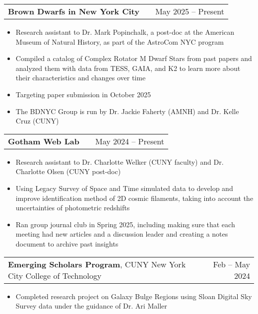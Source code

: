 \documentclass[a4paper,12pt]{article}
\makeatletter
\newenvironment{joblong}[2]
    {
    \begin{tabularx}{\linewidth}{@{}l X r@{}}
    #1 & \hfill &  #2 \\[3.75pt]
    \end{tabularx}
    \begin{minipage}[t]{\linewidth}
    \begin{itemize}[nosep,after=\strut, leftmargin=1em, itemsep=3pt,label=--]
    }
    {
    \end{itemize}
    \end{minipage}    
    }
\makeatother
\begin{document}
\begin{joblong}{\textbf{Brown Dwarfs in New York City}}{May 2025 -- Present}
\item Research assistant to Dr. Mark Popinchalk, a post-doc at the American Museum of Natural History, as part of the AstroCom NYC program
\item Compiled a catalog of Complex Rotator M Dwarf Stars from past papers and analyzed them with data from TESS, GAIA, and K2 to learn more about their characteristics and changes over time
\item Targeting paper submission in October 2025
\item The BDNYC Group is run by Dr. Jackie Faherty (AMNH) and Dr. Kelle Cruz (CUNY)
\end{joblong}

\begin{joblong}{\textbf{Gotham Web Lab}}{May 2024 -- Present}
\item Research assistant to Dr. Charlotte Welker (CUNY faculty) and Dr. Charlotte Olsen (CUNY post-doc)
\item Using Legacy Survey of Space and Time simulated data to develop and improve identification method of 2D cosmic filaments, taking into account the uncertainties of photometric redshifts
\item Ran group journal club in Spring 2025, including making sure that each meeting had new articles and a discussion leader and creating a notes document to archive past insights
\end{joblong}

\begin{joblong}{\textbf{Emerging Scholars Program}, CUNY New York City College of Technology}{Feb -- May 2024}
\item Completed research project on Galaxy Bulge Regions using Sloan Digital Sky Survey data under the guidance of Dr. Ari Maller 
\end{joblong}
\end{document}
